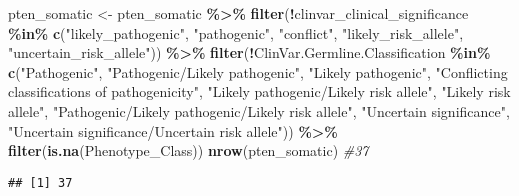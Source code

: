 \documentclass[
]{article}
\newenvironment{Shaded}{\begin{snugshade}}{\end{snugshade}}
\newcommand{\CommentTok}[1]{\textcolor[rgb]{0.56,0.35,0.01}{\textit{#1}}}
\newcommand{\FunctionTok}[1]{\textcolor[rgb]{0.13,0.29,0.53}{\textbf{#1}}}
\newcommand{\NormalTok}[1]{#1}
\newcommand{\OtherTok}[1]{\textcolor[rgb]{0.56,0.35,0.01}{#1}}
\newcommand{\SpecialCharTok}[1]{\textcolor[rgb]{0.81,0.36,0.00}{\textbf{#1}}}
\newcommand{\StringTok}[1]{\textcolor[rgb]{0.31,0.60,0.02}{#1}}
\begin{document}
\begin{Shaded}
\begin{Highlighting}[]
\NormalTok{pten\_somatic }\OtherTok{\textless{}{-}}\NormalTok{ pten\_somatic }\SpecialCharTok{\%\textgreater{}\%} 
  \FunctionTok{filter}\NormalTok{(}\SpecialCharTok{!}\NormalTok{clinvar\_clinical\_significance }\SpecialCharTok{\%in\%} \FunctionTok{c}\NormalTok{(}\StringTok{"likely\_pathogenic"}\NormalTok{, }\StringTok{"pathogenic"}\NormalTok{, }\StringTok{"conflict"}\NormalTok{, }\StringTok{"likely\_risk\_allele"}\NormalTok{, }\StringTok{"uncertain\_risk\_allele"}\NormalTok{)) }\SpecialCharTok{\%\textgreater{}\%}
  \FunctionTok{filter}\NormalTok{(}\SpecialCharTok{!}\NormalTok{ClinVar.Germline.Classification }\SpecialCharTok{\%in\%} \FunctionTok{c}\NormalTok{(}\StringTok{"Pathogenic"}\NormalTok{, }\StringTok{"Pathogenic/Likely pathogenic"}\NormalTok{, }\StringTok{"Likely pathogenic"}\NormalTok{,}
                                                 \StringTok{"Conflicting classifications of pathogenicity"}\NormalTok{, }\StringTok{"Likely pathogenic/Likely risk allele"}\NormalTok{,}
                                                 \StringTok{"Likely risk allele"}\NormalTok{, }\StringTok{"Pathogenic/Likely pathogenic/Likely risk allele"}\NormalTok{,}
                                                 \StringTok{"Uncertain significance"}\NormalTok{, }\StringTok{"Uncertain significance/Uncertain risk allele"}\NormalTok{)) }\SpecialCharTok{\%\textgreater{}\%}
  \FunctionTok{filter}\NormalTok{(}\FunctionTok{is.na}\NormalTok{(Phenotype\_Class))}
\FunctionTok{nrow}\NormalTok{(pten\_somatic) }\CommentTok{\#37}
\end{Highlighting}
\end{Shaded}

\begin{verbatim}
## [1] 37
\end{verbatim}

\begin{Shaded}
\end{Shaded}
\end{document}
